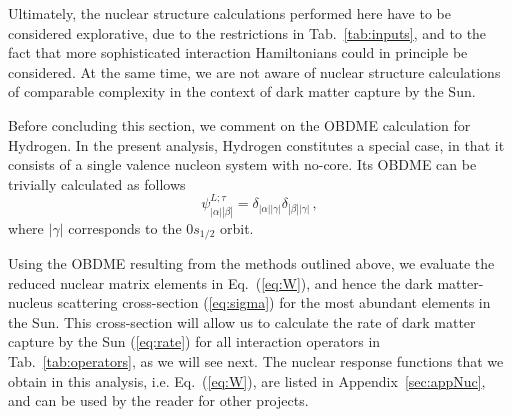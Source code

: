 \documentclass[11pt,a4paper]{article}
\begin{document}
Ultimately, the nuclear structure calculations performed here have to be considered explorative, due to the restrictions in Tab.~\ref{tab:inputs}, and to the fact that more sophisticated interaction Hamiltonians could in principle be considered. At the same time, we are not aware of nuclear structure calculations of comparable complexity in the context of dark matter capture by the Sun.

Before concluding this section, we comment on the OBDME calculation for Hydrogen. In the present analysis, Hydrogen constitutes a special case, in that it consists of a single valence nucleon system with no-core. Its OBDME can be trivially calculated as follows~\cite{Walecka1} 
\begin{equation}
\psi^{L;\tau}_{|\alpha| |\beta|}= \delta_{|\alpha| |\gamma|} \delta_{|\beta| |\gamma|}\,,
\end{equation}
where $|\gamma|$ corresponds to the $0s_{1/2}$ orbit. 

Using the OBDME resulting from the methods outlined above, we evaluate the reduced nuclear matrix elements in Eq.~(\ref{eq:W}), and hence the dark matter-nucleus scattering cross-section (\ref{eq:sigma}) for the most abundant elements in the Sun. This cross-section will allow us to calculate the rate of dark matter capture by the Sun (\ref{eq:rate}) for all interaction operators in Tab.~\ref{tab:operators}, as we will see next. The nuclear response functions that we obtain in this analysis, i.e. Eq.~(\ref{eq:W}), are listed in Appendix~\ref{sec:appNuc}, and can be used by the reader for other projects.
\end{document}
